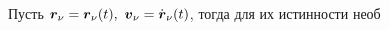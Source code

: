 Пусть $\vc{r}_\nu = \vc{r}_\nu (t), \ \vc{v}_\nu = \dot{\vc{r}}_\nu(t)$, тогда для их истинности необ

































